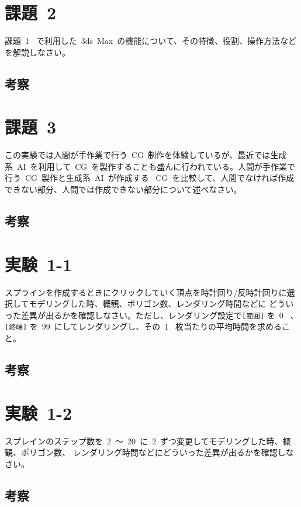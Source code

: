 \documentclass[a4j]{jarticle}
\begin{document}
\newpage
\section{課題\ 2}
課題\ 1 \ で利用した\ 3ds\ Max\ の機能について、その特徴、役割、操作方法などを解説しなさい。
\subsection{考察}
%

%

\newpage
\section{課題\ 3}
この実験では人間が手作業で行う\ CG\ 制作を体験しているが、最近では生成系\ AI\ を利用して\ CG\ を製作することも盛んに行われている。人間が手作業で行う\ CG\ 製作と生成系\ AI\ が作成する
\ CG\ を比較して、人間でなければ作成できない部分、人間では作成できない部分について述べなさい。
\subsection{考察}
%

%

\newpage
\section{実験\ 1-1}
スプラインを作成するときにクリックしていく頂点を時計回り/反時計回りに選択してモデリングした時、概観、ポリゴン数、レンダリング時間などに
どういった差異が出るかを確認しなさい。ただし、レンダリング設定で\verb$[範囲]$ を\ 0 \
、\verb$[終端]$ を\ 99\ にしてレンダリングし、その\ 1 \ 枚当たりの平均時間を求めること。
\subsection{考察}
%

%

\newpage
\section{実験\ 1-2}
スプレインのステップ数を\ 2\ ～\ 20\ に\ 2\ ずつ変更してモデリングした時、概観、ポリゴン数、
レンダリング時間などにどういった差異が出るかを確認しなさい。
\subsection{考察}
%
\end{document}
